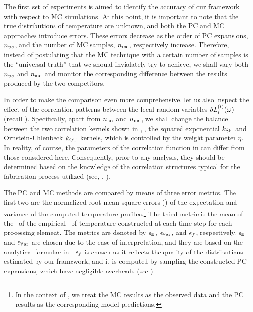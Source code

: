 The first set of experiments is aimed to identify the accuracy of our framework with respect to MC simulations.
At this point, it is important to note that the true distributions of temperature are unknown, and both the PC and MC approaches introduce errors.
These errors decrease as the order of PC expansions, ${n_\text{po}}$, and the number of MC samples, ${n_\text{mc}}$, respectively increase.
Therefore, instead of postulating that the MC technique with a certain number of samples is the ``universal truth'' that we should inviolately try to achieve, we shall vary both ${n_\text{po}}$ and ${n_\text{mc}}$ and monitor the corresponding difference between the results produced by the two competitors.

In order to make the comparison even more comprehensive, let us also inspect the effect of the correlation patterns between the local random variables $\delta L^{(l)}_i(\omega)$ (recall ).
Specifically, apart from ${n_\text{po}}$ and ${n_\text{mc}}$, we shall change the balance between the two correlation kernels shown in , \ie, the squared exponential $\fCorr_\SE$ and Ornstein-Uhlenbeck $\fCorr_\OU$ kernels, which is controlled by the weight parameter $\eta$.
In reality, of course, the parameters of the correlation function in  can differ from those considered here.
Consequently, prior to any analysis, they should be determined based on the knowledge of the correlation structures typical for the fabrication process utilized (see, \eg, \cite{ghanta2006, friedberg2005}).

The PC and MC methods are compared by means of three error metrics.
The first two are the normalized root mean square errors (\nrmses) of the expectation and variance of the computed temperature profiles.\footnote{In the context of \nrmses, we treat the MC results as the observed data and the PC results as the corresponding model predictions.}
The third metric is the mean of the \nrmses\ of the empirical \pdfs\ of temperature constructed at each time step for each processing element.
The metrics are denoted by $\epsilon_\mathbb{E}$, $\epsilon_{\mathbb{V}\text{ar}}$, and $\epsilon_f$, respectively.
$\epsilon_\mathbb{E}$ and $\epsilon_{\mathbb{V}\text{ar}}$ are chosen due to the ease of interpretation, and they are based on the analytical formulae in .
$\epsilon_f$ is chosen as it reflects the quality of the distributions estimated by our framework, and it is computed by sampling the constructed PC expansions, which have negligible overheads (see ).

